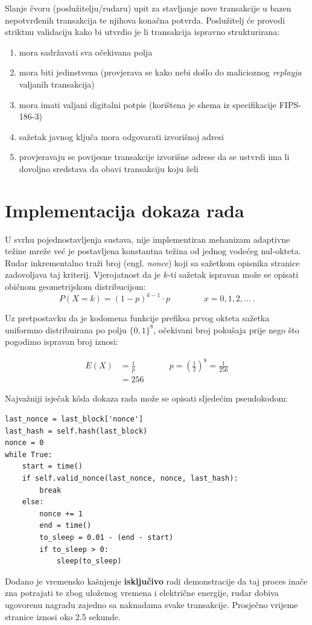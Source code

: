 \documentclass[utf8, zavrsni]{fer}
\begin{document}
Slanje čvoru (poslužitelju/rudaru) upit za stavljanje nove transakcije u bazen nepotvrđenih transakcija te njihova konačna potvrda. Poslužitelj će provodi striktnu validaciju kako bi utvrdio je li transakcija ispravno strukturirana:

\begin{enumerate}
	\item mora sadržavati sva očekivana polja
	\item mora biti jedinstvena (provjerava se kako nebi došlo do malicioznog \textit{replayja} valjanih transakcija)
	\item mora imati valjani digitalni potpis (korištena je shema iz specifikacije FIPS-186-3)
	\item sažetak javnog ključa mora odgovarati izvorišnoj adresi
	\item provjeravaju se povijesne transakcije izvorišne adrese da se ustvrdi ima li dovoljno sredstava da obavi transakciju koju želi
\end{enumerate}

\section{Implementacija dokaza rada}
U svrhu pojednostavljenja sustava, nije implementiran mehanizam adaptivne težine mreže već je postavljena konstantna težina od jednog vodećeg nul-okteta. Rudar inkrementalno traži broj (engl. \textit{nonce}) koji sa sažetkom opisnika stranice zadovoljava taj kriterij. Vjerojatnost da je $k$-ti sažetak ispravan može se opisati običnom geometrijskom distribucijom:
$$
P(X=k) = (1 - p) ^ {k-1} \cdot p \qquad \qquad x=0,1,2,\ldots \, .
$$

Uz pretpostavku da je kodomena funkcije prefiksa prvog okteta sažetka uniformno distribuirana po polju $\{0,1\} ^{8}$, očekivani broj pokušaja prije nego što pogodimo ispravan broj iznosi:

\begin{equation} \label{eq1}
\begin{split}
E(X) &= \frac{1}{p} \qquad \qquad p = (\frac{1}{2}) ^ {8} = \frac{1}{256} \\
     &= 256
\end{split}
\end{equation}

Najvažniji isječak kôda dokaza rada može se opisati sljedećim pseudokodom:

\begin{verbatim}
last_nonce = last_block['nonce']
last_hash = self.hash(last_block)
nonce = 0
while True:
	start = time()
	if self.valid_nonce(last_nonce, nonce, last_hash):
		break
	else:
		nonce += 1
		end = time()
		to_sleep = 0.01 - (end - start)
		if to_sleep > 0:
		    sleep(to_sleep)

\end{verbatim}
Dodano je vremensko kašnjenje \textbf{isključivo} radi demonstracije da taj proces inače zna potrajati te zbog uloženog vremena i električne energije, rudar dobiva ugovorenu nagradu zajedno sa naknadama svake transakcije. Prosječno vrijeme stranice iznosi oko 2.5 sekunde.
\end{document}
